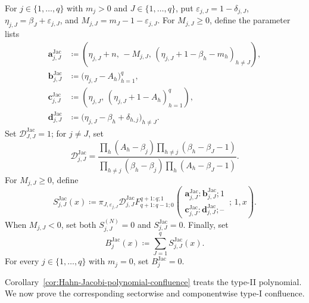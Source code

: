 \documentclass[10pt]{amsart}
\theoremstyle{plain}
\theoremstyle{definition}
\theoremstyle{remark}
\begin{document}
For \(j\in\{1,\ldots,q\}\) with \(m_j>0\) and
\(J\in\{1,\ldots,q\}\), put
\(\varepsilon_{j,J}=1-\delta_{j,J}\),
\(\eta_{j,J}=\beta_J+\varepsilon_{j,J}\), and
\(M_{j,J}=m_J-1-\varepsilon_{j,J}\).
For \(M_{j,J}\ge0\), define the parameter lists
\begin{align*}
 \boldsymbol a_{j,J}^{\mathrm{Jac}}
 &\coloneq{}
 \left(
  \eta_{j,J}+n,\,-M_{j,J},\,
  (\eta_{j,J}+1-\beta_h-m_h)_{h\ne J}
 \right),\\
 \boldsymbol b_{j,J}^{\mathrm{Jac}}
 &\coloneq{}\bigl(\eta_{j,J}-A_h\bigr)_{h=1}^q,\\
 \boldsymbol c_{j,J}^{\mathrm{Jac}}
 &\coloneq{}
 \left(
  \eta_{j,J},\,
  (\eta_{j,J}+1-A_h)_{h=1}^q
 \right),\\
 \boldsymbol d_{j,J}^{\mathrm{Jac}}
 &\coloneq{}\bigl(\eta_{j,J}-\beta_h+\delta_{h,j}\bigr)_{h\ne J}.
\end{align*}
Set \(\mathcal D_{J,J}^{\mathrm{Jac}}=1\); for \(j\ne J\), set
\begin{equation}
 \mathcal D_{j,J}^{\mathrm{Jac}}
 =
 \frac{
  \prod_h(A_h-\beta_j)
  \prod_{h\ne j}(\beta_h-\beta_J-1)
 }{
  \prod_{h\ne j}(\beta_h-\beta_j)
  \prod_h(A_h-\beta_J-1)
 }.
 \label{eq:Jacobi-KdF-sector-prefactor}
\end{equation}
For \(M_{j,J}\ge0\), define
\begin{equation}
 S_{j,J}^{\mathrm{Jac}}(x)\coloneq
 \pi_{J,\varepsilon_{j,J}}\mathcal D_{j,J}^{\mathrm{Jac}}
 F_{q+1:q-1;0}^{q+1:q;1}
 \left(
 \begin{matrix}
  \boldsymbol a_{j,J}^{\mathrm{Jac}}:
  \boldsymbol b_{j,J}^{\mathrm{Jac}};1\\
  \boldsymbol c_{j,J}^{\mathrm{Jac}}:
  \boldsymbol d_{j,J}^{\mathrm{Jac}};\text{--}
 \end{matrix}
 \,;\,1,x
 \right).
 \label{eq:Jacobi-KdF-sector}
\end{equation}
When \(M_{j,J}<0\), set both
\(S_{j,J}^{(N)}=0\) and \(S_{j,J}^{\mathrm{Jac}}=0\). Finally, set
\begin{equation}
 B_j^{\mathrm{Jac}}(x)\coloneq\sum_{J=1}^qS_{j,J}^{\mathrm{Jac}}(x).
 \label{eq:Jacobi-KdF-components}
\end{equation}
For every \(j\in\{1,\ldots,q\}\) with \(m_j=0\), set
\(B_j^{\mathrm{Jac}}=0\).

Corollary~\ref{cor:Hahn-Jacobi-polynomial-confluence} treats the type-II
polynomial. We now prove the corresponding sectorwise and componentwise
type-I confluence.
\end{document}
